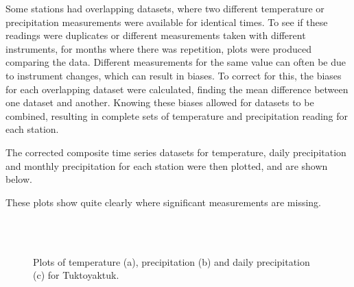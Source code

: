 \documentclass[12pt, oneside]{article}
\begin{document}
Some stations had overlapping datasets, where two different temperature or precipitation measurements were available for identical times. To see if these readings were duplicates or different measurements taken with different instruments, for months where there was repetition, plots were produced comparing the data. Different measurements for the same value can often be due to instrument changes, which can result in biases. To correct for this, the biases for each overlapping dataset were calculated, finding the mean difference between one dataset and another. Knowing these biases allowed for datasets to be combined, resulting in complete sets of temperature and precipitation reading for each station. 

The corrected composite time series datasets for temperature, daily precipitation and monthly precipitation for each station were then plotted, and are shown below. 

These plots show quite clearly where significant measurements are missing. 






\begin{figure}
  \centering
   \\
   \\
  \caption{Plots of temperature (a), precipitation (b) and daily precipitation (c) for Tuktoyaktuk.} \label{fig:AB}
\end{figure}
\end{document}
